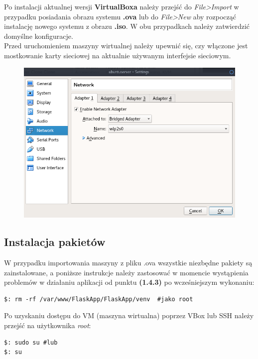 \documentclass[12pt,a4paper]{article}
\begin{document}
Po instalacji aktualnej wersji \textbf{VirtualBoxa} należy przejść do \textit{File>Import} w przypadku posiadania obrazu systemu \textbf{.ova } lub do \textit{File>New } aby rozpocząć instalację nowego systemu z obrazu \textbf{.iso}. W obu przypadkach należy zatwierdzić domyślne konfiguracje.\\

Przed uruchomieniem maszyny wirtualnej należy upewnić się, czy włączone jest mostkowanie karty sieciowej na aktualnie używanym interfejsie sieciowym. 
\begin{figure}[h!]
\centering
\includegraphics[scale=0.4]{d}
\end{figure}
\newpage

\subsection{Instalacja pakietów}
\quad
W przypadku importowania maszyny z pliku .ova wszystkie niezbędne pakiety są zainstalowane, a poniższe instrukcje należy zastosować w momencie wystąpienia problemów w działaniu aplikacji od punktu \textbf{(1.4.3)} po wcześniejszym wykonaniu:
\begin{lstlisting}
$: rm -rf /var/www/FlaskApp/FlaskApp/venv  #jako root
\end{lstlisting}
\quad

Po uzyskaniu dostępu do VM (maszyna wirtualna) poprzez VBox lub SSH należy przejść na użytkownika \textit{root}:\\
\begin{lstlisting}
$: sudo su #lub
$: su
\end{lstlisting}
\end{document}
